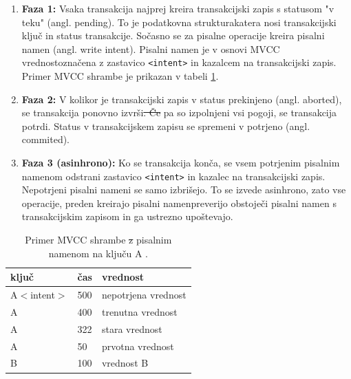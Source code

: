 \documentclass[a4paper, 12pt]{book}
\providecommand{\DIFaddtex}[1]{{\protect\color{blue}\uwave{#1}}} %
\providecommand{\DIFdeltex}[1]{{\protect\color{red}\sout{#1}}}                      %
\providecommand{\DIFaddbegin}{} %
\providecommand{\DIFaddend}{} %
\providecommand{\DIFdelbegin}{} %
\providecommand{\DIFdelend}{} %
\providecommand{\DIFaddFL}[1]{\DIFadd{#1}} %
\providecommand{\DIFdelFL}[1]{\DIFdel{#1}} %
\providecommand{\DIFaddbeginFL}{} %
\providecommand{\DIFaddendFL}{} %
\providecommand{\DIFdelbeginFL}{} %
\providecommand{\DIFdelendFL}{} %
\providecommand{\DIFadd}[1]{\texorpdfstring{\DIFaddtex{#1}}{#1}} %
\providecommand{\DIFdel}[1]{\texorpdfstring{\DIFdeltex{#1}}{}} %
\newcommand{\DIFscaledelfig}{0.5}
\newlength{\DIFdelgraphicswidth} %
\newlength{\DIFdelgraphicsheight} %
\newcommand{\DIFaddincludegraphics}[2][]{{\color{blue}\fbox{\DIFOincludegraphics[#1]{#2}}}} %
\newcommand{\DIFdelincludegraphics}[2][]{%
\sbox{\DIFdelgraphicsbox}{\DIFOincludegraphics[#1]{#2}}%
\settoboxwidth{\DIFdelgraphicswidth}{\DIFdelgraphicsbox} %
\settoboxtotalheight{\DIFdelgraphicsheight}{\DIFdelgraphicsbox} %
\scalebox{\DIFscaledelfig}{%
\parbox[b]{\DIFdelgraphicswidth}{\usebox{\DIFdelgraphicsbox}\\[-\baselineskip] \rule{\DIFdelgraphicswidth}{0em}}\llap{\resizebox{\DIFdelgraphicswidth}{\DIFdelgraphicsheight}{%
\setlength{\unitlength}{\DIFdelgraphicswidth}%
\begin{picture}(1,1)%
\thicklines\linethickness{2pt} %
{\color[rgb]{1,0,0}\put(0,0){\framebox(1,1){}}}%
{\color[rgb]{1,0,0}\put(0,0){\line( 1,1){1}}}%
{\color[rgb]{1,0,0}\put(0,1){\line(1,-1){1}}}%
\end{picture}%
}\hspace*{3pt}}} %
} %
\DeclareRobustCommand{\DIFaddbegin}{\DIFOaddbegin \let\includegraphics\DIFaddincludegraphics} %
\DeclareRobustCommand{\DIFaddend}{\DIFOaddend \let\includegraphics\DIFOincludegraphics} %
\DeclareRobustCommand{\DIFdelbegin}{\DIFOdelbegin \let\includegraphics\DIFdelincludegraphics} %
\DeclareRobustCommand{\DIFdelend}{\DIFOaddend \let\includegraphics\DIFOincludegraphics} %
\DeclareRobustCommand{\DIFaddbeginFL}{\DIFOaddbeginFL \let\includegraphics\DIFaddincludegraphics} %
\DeclareRobustCommand{\DIFaddendFL}{\DIFOaddendFL \let\includegraphics\DIFOincludegraphics} %
\DeclareRobustCommand{\DIFdelbeginFL}{\DIFOdelbeginFL \let\includegraphics\DIFdelincludegraphics} %
\DeclareRobustCommand{\DIFdelendFL}{\DIFOaddendFL \let\includegraphics\DIFOincludegraphics} %
\begin{document}
\begin{enumerate}
    \item \textbf{Faza 1:} Vsaka transakcija najprej kreira transakcijski zapis s statusom "v teku" (angl. pending). To je podatkovna struktura\DIFaddbegin \DIFadd{, }\DIFaddend katera nosi transakcijski ključ in status transakcije. Sočasno se za pisalne operacije kreira pisalni namen (angl. write intent). Pisalni namen je v osnovi MVCC vrednost\DIFaddbegin \DIFadd{, }\DIFaddend označena z zastavico \texttt{<intent>} in kazalcem na transakcijski zapis. Primer MVCC shrambe je prikazan v tabeli \ref{tbl_crdb_mvcc_store}.
    \item \textbf{Faza 2:} V kolikor je transakcijski zapis \DIFaddbegin \DIFadd{spremenjen }\DIFaddend v status prekinjeno (angl. aborted), se transakcija ponovno izvrši\DIFdelbegin \DIFdel{. Če }\DIFdelend \DIFaddbegin \DIFadd{, če }\DIFaddend pa so izpolnjeni vsi pogoji, se transakcija potrdi. Status v transakcijskem zapisu se spremeni v potrjeno (angl. commited).
    \item \textbf{Faza 3 (asinhrono):} Ko se transakcija konča, se vsem potrjenim pisalnim namenom odstrani zastavico \texttt{<intent>} in kazalec na transakcijski zapis. Nepotrjeni pisalni nameni se samo izbrišejo. To se izvede asinhrono, zato vse operacije, preden kreirajo pisalni namen\DIFaddbegin \DIFadd{, }\DIFaddend preverijo obstoječi pisalni namen s transakcijskim zapisom in ga ustrezno upoštevajo.
\end{enumerate}

\begin{table}[H]
\begin{center}
\begin{tabular}{ l|l|l } 
\textbf{ključ} & \textbf{čas} & \textbf{vrednost} \\
\hline
A$<$intent$>$ & 500 & nepotrjena vrednost \\
A & 400 & trenutna vrednost \\ 
A & 322 & stara vrednost \\ 
A & 50 & prvotna vrednost \\
B & 100 & vrednost B \\
\end{tabular}
\end{center}
\caption{Primer MVCC shrambe \DIFdelbeginFL \DIFdelFL{z }\DIFdelendFL \DIFaddbeginFL \DIFaddFL{s }\DIFaddendFL pisalnim namenom na ključu A \cite{CRDB-blog-transaction-isolation}.}
\label{tbl_crdb_mvcc_store}
\end{table}
\end{document}
